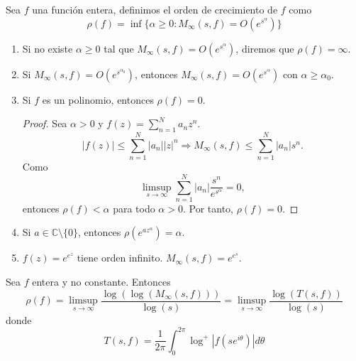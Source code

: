 \begin{definition}
    Sea $f$ una función entera, definimos el orden de crecimiento de $f$ como
    $$\rho(f) = \inf\{\alpha \geq 0 : M_\infty(s, f) = O(e^{s^\alpha})\}$$
\end{definition}

\begin{remark}
    \hfill
    \begin{enumerate}
        \item Si no existe $\alpha \geq 0$ tal que $M_\infty(s, f) = O(e^{s^\alpha})$, diremos que $\rho(f) = \infty$.

        \item Si $M_\infty(s, f) = O(e^{s^{\alpha_0}})$, entonces $M_\infty(s, f) = O(e^{s^\alpha})$ con $\alpha \geq \alpha_0$.

        \item Si $f$ es un polinomio, entonces $\rho(f) = 0$.
              \begin{proof}
                  Sea $\alpha > 0$ y $f(z) = \sum_{n=1}^N a_nz^n$.
                  $$|f(z)| \leq \sum_{n=1}^N |a_n||z|^n \Rightarrow M_\infty(s, f) \leq \sum_{n=1}^N |a_n|s^n.$$
                  Como
                  $$\limsup_{s \to \infty} \sum_{n=1}^N |a_n|\frac{s^n}{e^{s^\alpha}} = 0,$$
                  entonces $\rho(f) < \alpha$ para todo $\alpha > 0$.
                  Por tanto, $\rho(f) = 0$.
              \end{proof}

        \item Si $a \in \mathbb{C} \setminus \{0\}$, entonces $\rho(e^{az^\alpha}) = \alpha$.

        \item $f(z) = e^{e^z}$ tiene orden infinito.
              $M_\infty(s, f) = e^{e^s}$.
    \end{enumerate}
\end{remark}

\begin{proposition}
    Sea $f$ entera y no constante.
    Entonces
    $$\rho(f) = \limsup_{s \to \infty} \frac{\log(\log(M_\infty(s, f)))}{\log(s)} = \limsup_{s \to \infty} \frac{\log(T(s, f))}{\log(s)}$$
    donde
    $$T(s, f) = \frac{1}{2\pi} \int_0^{2\pi} \log^+|f(se^{i\theta})|d\theta$$
\end{proposition}


